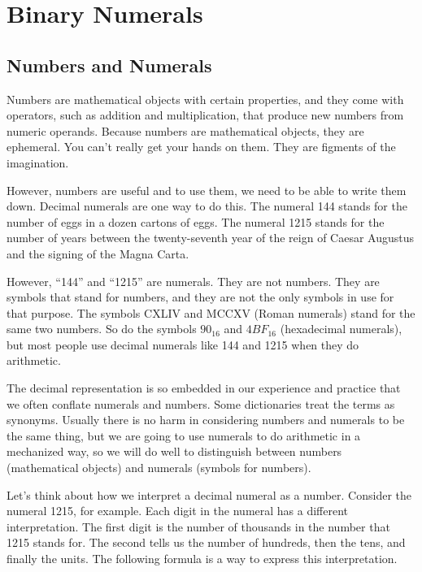 \chapter{Binary Numerals}
\label{ch:binary-numerals}
\section{Numbers and Numerals}
\label{sec:numbers-numerals}
Numbers are mathematical objects with certain properties,
and they come with operators, such as addition
and multiplication, that produce new numbers from numeric
operands.
Because numbers are mathematical objects, they are ephemeral.
You can't really get your hands on them.
They are figments of the imagination.

However, numbers are useful and to use them,
we need to be able to write them down.
Decimal numerals are one way to do this.
The numeral 144 stands for the number
of eggs in a dozen cartons of eggs.
The numeral 1215 stands for the number of
years between the twenty-seventh year of the reign
of Caesar Augustus and the signing of the Magna Carta.

However, ``144'' and ``1215'' are numerals.
They are not numbers. They are symbols that stand for numbers,
and they are not the only symbols in use for that purpose.
The symbols CXLIV and MCCXV (Roman numerals) stand for the same two numbers.
So do the symbols $90_{16}$ and $4BF_{16}$ (hexadecimal numerals),
but most people use decimal numerals like 144 and 1215 when they do arithmetic.

The decimal representation is so embedded in
our experience and practice that we often conflate
numerals and numbers. Some dictionaries treat the terms as synonyms.
Usually there is no harm in considering numbers and numerals
to be the same thing, but we are going to use numerals
to do arithmetic in a mechanized way, so we will
do well to distinguish between
numbers (mathematical objects)
and numerals (symbols for numbers).

Let's think about how we interpret a decimal numeral as a number.
Consider the numeral 1215, for example.
Each digit in the numeral has a different interpretation.
The first digit is the number of thousands in the number
that 1215 stands for. The second tells us the number
of hundreds, then the tens, and finally the units.
The following formula is a way to express this interpretation.

